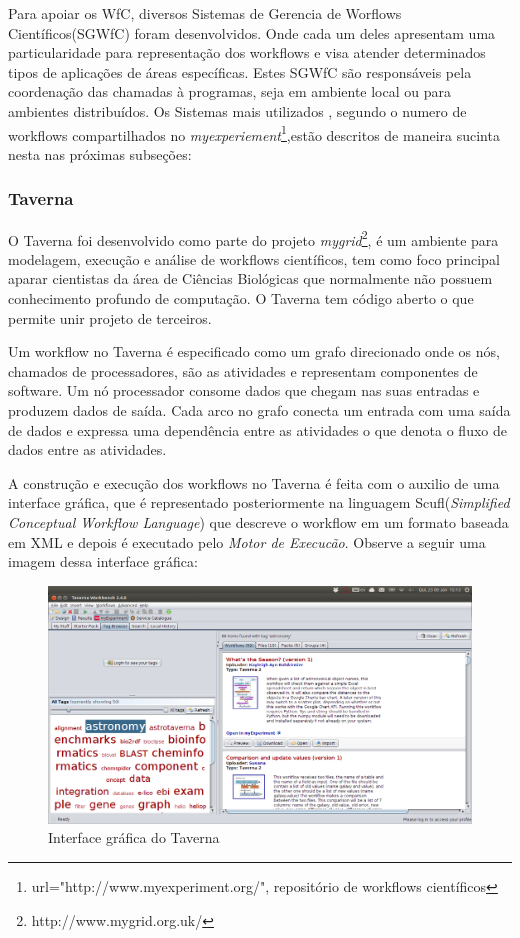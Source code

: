 		Para apoiar os WfC, diversos Sistemas de Gerencia de Worflows Científicos(SGWfC) foram desenvolvidos. Onde cada um deles apresentam uma particularidade para representação dos workflows e visa atender determinados tipos de aplicações de áreas específicas. Estes SGWfC são responsáveis pela coordenação das chamadas à programas, seja em ambiente local ou para ambientes distribuídos\cite{Ogasawara2011}. Os Sistemas mais utilizados , segundo o numero de workflows compartilhados no \textit{myexperiement}\footnote{url="http://www.myexperiment.org/", repositório de workflows científicos},estão descritos de maneira sucinta nesta nas próximas subseções:
		
		\subsubsection{Taverna}
				O Taverna foi desenvolvido como parte do projeto \textit{mygrid}\footnote{http://www.mygrid.org.uk/}, é um ambiente para modelagem, execução e análise de workflows científicos, tem como foco principal aparar cientistas da área de Ciências Biológicas que normalmente não possuem conhecimento profundo de computação. O Taverna tem código aberto o que permite unir projeto de terceiros\cite{Teixeira2013}.

				Um workflow no Taverna é especificado como um grafo direcionado onde os nós, chamados de processadores,  são as atividades e representam componentes de software. Um nó processador consome dados que chegam nas suas entradas e produzem dados de saída. Cada arco no grafo conecta um entrada com uma saída de dados e expressa uma dependência entre as atividades o que denota o fluxo de dados entre as atividades\cite{Teixeira2013}.
				
	A construção e execução dos workflows no Taverna é feita com o auxilio de uma interface gráfica, que é  representado posteriormente na linguagem Scufl(\textit{Simplified Conceptual Workflow Language}) que descreve o workflow em um formato baseada em XML e depois é executado pelo \textit{Motor de Execucão}\cite{Teixeira2013}. Observe a seguir uma imagem dessa interface gráfica:
				
		\begin{figure}[!h]
			\centering
			\includegraphics[width=1.1\textwidth]{img/taverna.png}
			\caption{Interface gráfica do Taverna}
		\end{figure}
		

